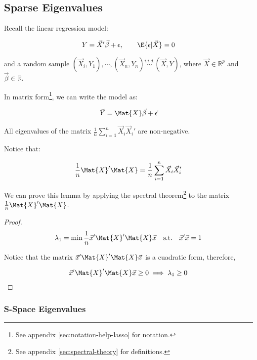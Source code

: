 \subsection{Sparse Eigenvalues}

Recall the linear regression model:

\begin{align*}
  Y = \Vec{X}'\Vec{\beta} + \epsilon, \qquad \E{\epsilon | \Vec{X}} = 0
\end{align*}

and a random sample $(\Vec{X}_i, Y_1), \cdots, (\Vec{X}_n, Y_n) \overset{i.i.d.}{\sim} (\Vec{X}, Y)$, where $\Vec{X} \in \mathbb{R}^p$ and $\Vec{\beta} \in \mathbb{R}$.

In matrix form\footnote{See appendix \ref{sec:notation-help-lasso} for notation.}, we can write the model as:

\begin{align*}
  \Vec{Y} = \Mat{X}\Vec{\beta} + \Vec{\epsilon}
\end{align*}

\begin{lemma}
    All eigenvalues of the matrix $\frac{1}{n}\sum_{i=1}^n \Vec{X}_i\Vec{X}_i'$ are non-negative.
\end{lemma}

Notice that:

\[
    \frac{1}{n}\Mat{X}'\Mat{X} = \frac{1}{n}\sum_{i=1}^n \Vec{X}_i\Vec{X}_i'
\]

We can prove this lemma by applying the spectral theorem\footnote{See appendix \ref{sec:spectral-theory} for definitions.} to the matrix $\frac{1}{n}\Mat{X}'\Mat{X}$.

\begin{proof}
    \begin{align*}
    \lambda_1 = \min \frac{1}{n}\Vec{x}'\Mat{X}'\Mat{X}\Vec{x} \quad \text{s.t.} \quad \Vec{x}'\Vec{x} = 1
    \end{align*}

    Notice that the matrix $\Vec{x}'\Mat{X}'\Mat{X}\Vec{x}$ is a cuadratic form, therefore, 
    
    \begin{align*}
        \Vec{x}'\Mat{X}'\Mat{X}\Vec{x} \geq 0 \implies \lambda_1 \geq 0
    \end{align*}
\end{proof}

\subsubsection{S-Space Eigenvalues}

